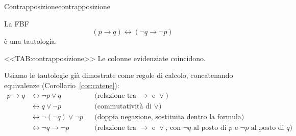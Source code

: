 \begin{concetto}
\begin{Proposizione}{Contrapposizione}{contrapposizione}
    \begin{prerequisiti}
    \end{prerequisiti}
    La FBF
    \[ (p \rightarrow q) \leftrightarrow (\neg q \rightarrow \neg p) \]
    è una tautologia.
\end{Proposizione}

\begin{dimostrazione}
    <<TAB:contrapposizione>>
    Le colonne evidenziate coincidono.
\end{dimostrazione}

\begin{dimostrazione}
    Usiamo le tautologie già dimostrate come regole di calcolo, concatenando equivalenze (Corollario~\ref{cor:catene}):
    \[
    \begin{aligned}
        p \rightarrow q &\leftrightarrow \neg p \vee q && \text{(relazione tra $\rightarrow$ e $\vee$)}\\
        &\leftrightarrow q \vee \neg p && \text{(commutatività di $\vee$)}\\
        &\leftrightarrow \neg(\neg q) \vee \neg p && \text{(doppia negazione, sostituita dentro la formula)}\\
        &\leftrightarrow \neg q \rightarrow \neg p && \text{(relazione tra $\rightarrow$ e $\vee$, con $\neg q$ al posto di $p$ e $\neg p$ al posto di $q$)}.
    \end{aligned}
    \]
\end{dimostrazione}
\end{concetto}

